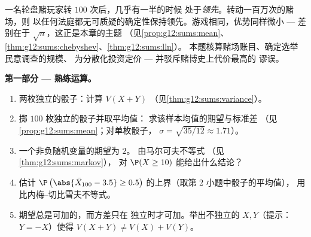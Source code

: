 \begin{problem}
\label{pb:g12:sums:1}
一名轮盘赌玩家转 $100$ 次后，几乎有一半的时候
处于\emph{领先}。转动一百万次的赌场，则
以任何法庭都无可质疑的确定性保持领先。游戏相同，优势同样微小 ---
差别在于 $\sqrt n$，这正是本章的主题
（见\cref{prop:g12:sums:mean}、
\cref{thm:g12:sums:chebyshev}、\cref{thm:g12:sums:lln}）。
本题核算赌场账目、确定选举民意调查的规模、
为分散化投资定价 --- 并驳斥赌博史上代价最高的
谬误。

\medskip
\noindent\textbf{第一部分 --- 熟练运算。}
\begin{enumerate}
  \item 两枚独立的骰子：计算 $V(X + Y)$
        （见\cref{thm:g12:sums:variance}）。
  \item 掷 $100$ 枚独立的骰子并取平均值：
        求该样本均值的期望与标准差
        （见\cref{prop:g12:sums:mean}；对单枚骰子，
        $\sigma = \sqrt{35/12} \approx 1.71$）。
  \item 一个非负随机变量的期望为 $2$。
        由马尔可夫不等式
        （见\cref{thm:g12:sums:markov}），
        对 $\P(X \geq 10)$ 能给出什么结论？
  \item 估计 $\P\left(\abs{\bar X_{100} - 3.5} \geq
        0.5\right)$ 的上界（取第 2 小题中骰子的平均值），
        用比内梅–切比雪夫不等式。
  \item 期望总是可加的，而方差只在
        独立时才可加。举出不独立的 $X, Y$（提示：
        $Y = -X$）使得
        $V(X + Y) \neq V(X) + V(Y)$。
\end{enumerate}


\end{problem}
